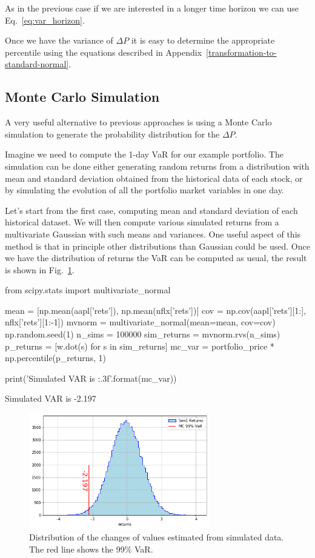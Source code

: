 As in the previous case if we are interested in a longer time horizon we can use Eq.~\ref{eq:var_horizon}.

Once we have the variance of \(\Delta P\) it is easy to determine the appropriate percentile using the equations described in Appendix~\ref{transformation-to-standard-normal}.

\subsection{Monte Carlo Simulation}
\label{monte-carlo-simulation}

A very useful alternative to previous approaches is using a Monte Carlo simulation to generate the probability distribution for the $\Delta P$. 

Imagine we need to compute the 1-day VaR for our example portfolio. The simulation can be done either generating random returns from a distribution with mean and standard deviation obtained from the historical data of each stock, or by simulating the evolution of all the portfolio market variables in one day.

Let's start from the first case, computing mean and standard deviation of each historical dataset. We will then compute various simulated returns from a multivariate Gaussian with such means and variances. One useful aspect of this method is that in principle other distributions than Gaussian could be used. Once we have the distribution of returns the VaR can be computed as usual, the result is shown in Fig.~\ref{fig:mc1_var}.

\begin{ipython}
from scipy.stats import multivariate_normal

mean = [np.mean(aapl['rets']), np.mean(nflx['rets'])]
cov = np.cov(aapl['rets'][1:], nflx['rets'][1:-1])
mvnorm = multivariate_normal(mean=mean, cov=cov)
np.random.seed(1)
n_sims = 100000
sim_returns = mvnorm.rvs(n_sims)
p_returns = [w.dot(s) for s in sim_returns]
mc_var = portfolio_price * np.percentile(p_returns, 1)

print('Simulated VAR is {:.3f}'.format(mc_var))
\end{ipython}
\begin{ioutput}
Simulated VAR is -2.197
\end{ioutput}

\begin{figure}[htb]
	\centering
	\includegraphics[width=0.7\textwidth]{figures/sim1_var}
	\caption{Distribution of the changes of values estimated from simulated data. The red line shows the 99\% VaR.}
	\label{fig:mc1_var}
\end{figure}

